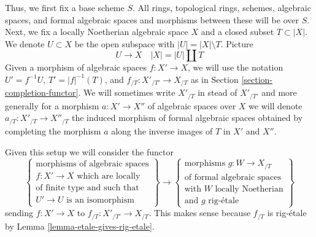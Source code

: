 \documentclass[10pt,a4paper]{amsart}
\theoremstyle{plain}
\theoremstyle{definition}
\theoremstyle{remark}
\numberwithin{equation}{subsection}
\begin{document}
\medskip\noindent
Thus, we first fix a base scheme $S$. All rings, topological rings,
schemes, algebraic spaces, and formal algebraic spaces and
morphisms between these will be over $S$. Next, we fix a
locally Noetherian algebraic space $X$ and a closed subset $T \subset |X|$.
We denote $U \subset X$ be the open subspace with $|U| = |X| \setminus T$.
Picture
$$
U \to X \quad |X| = |U| \amalg T
$$
Given a morphism of algebraic spaces $f : X' \to X$, we will use the notation
$U' = f^{-1}U$, $T' = |f|^{-1}(T)$, and $f_{/T} : X'_{/T'} \to X_{/T}$ as in
Section \ref{section-completion-functor}. We will sometimes write
$X'_{/T}$ in stead of $X'_{/T'}$ and more generally for a morphism
$a : X' \to X''$ of algebraic spaces over $X$ we will denote
$a_{/T} : X'_{/T} \to X''_{/T}$ the induced morphism of formal
algebraic spaces obtained by completing the morphism $a$ along
the inverse images of $T$ in $X'$ and $X''$.

\medskip\noindent
Given this setup we will consider the functor
\begin{equation}
\label{equation-completion-functor}
\left\{
\begin{matrix}
\text{morphisms of algebraic spaces}\\
f : X' \to X\text{ which are locally}\\
\text{of finite type and such that}\\
U' \to U\text{ is an isomorphism}
\end{matrix}
\right\}
\longrightarrow
\left\{
\begin{matrix}
\text{morphisms }g : W \to X_{/T}\\
\text{of formal algebraic spaces}\\
\text{with }W\text{ locally Noetherian}\\
\text{and }g\text{ rig-\'etale}
\end{matrix}
\right\}
\end{equation}
sending $f : X' \to X$ to $f_{/T} : X'_{/T'} \to X_{/T}$.
This makes sense because $f_{/T}$ is rig-\'etale by
Lemma \ref{lemma-etale-gives-rig-etale}.
\end{document}
